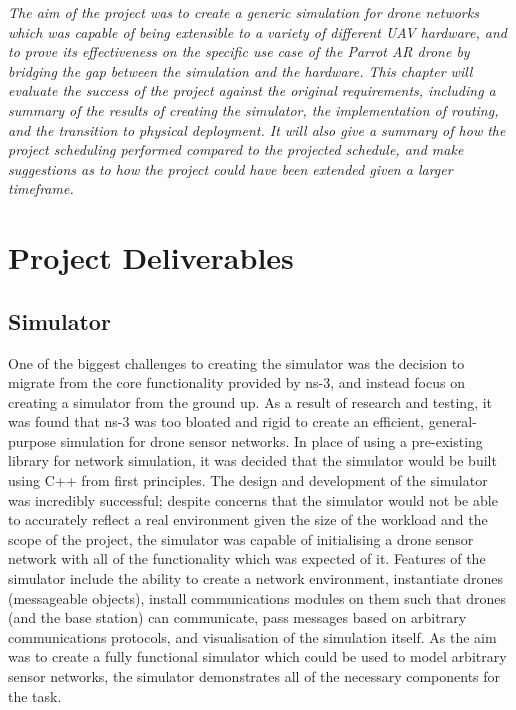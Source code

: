\emph{The aim of the project was to create a generic simulation for drone networks which was capable of being extensible to a variety of different UAV hardware, and to prove its effectiveness on the specific use case of the Parrot AR drone by bridging the gap between the simulation and the hardware. This chapter will evaluate the success of the project against the original requirements, including a summary of the results of creating the simulator, the implementation of routing, and the transition to physical deployment. It will also give a summary of how the project scheduling performed compared to the projected schedule, and make suggestions as to how the project could have been extended given a larger timeframe.}
	\section{Project Deliverables}
		\subsection{Simulator}
One of the biggest challenges to creating the simulator was the decision to migrate from the core functionality provided by ns-3, and instead focus on creating a simulator from the ground up. As a result of research and testing, it was found that ns-3 was too bloated and rigid to create an efficient, general-purpose simulation for drone sensor networks. In place of using a pre-existing library for network simulation, it was decided that the simulator would be built using C++ from first principles. The design and development of the simulator was incredibly successful; despite concerns that the simulator would not be able to accurately reflect a real environment given the size of the workload and the scope of the project, the simulator was capable of initialising a drone sensor network with all of the functionality which was expected of it. Features of the simulator include the ability to create a network environment, instantiate drones (messageable objects), install communications modules on them such that drones (and the base station) can communicate, pass messages based on arbitrary communications protocols, and visualisation of the simulation itself. As the aim was to create a fully functional simulator which could be used to model arbitrary sensor networks, the simulator demonstrates all of the necessary components for the task.
